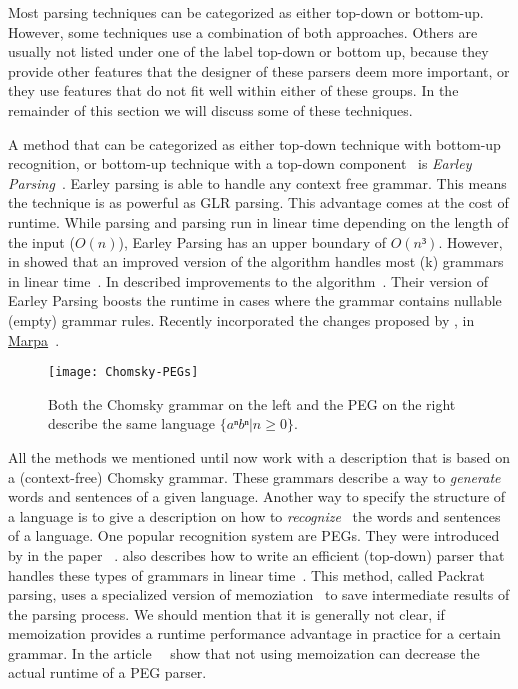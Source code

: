 Most parsing techniques can be categorized as either top-down or bottom-up. However, some techniques use a combination of both approaches. Others are usually not listed under one of the label top-down or bottom up, because they provide other features that the designer of these parsers deem more important, or they use features that do not fit well within either of these groups. In the remainder of this section we will discuss some of these techniques.

A method that can be categorized as either top-down technique with bottom-up recognition, or bottom-up technique with a top-down component~\cite[p. 206]{grune2008parsing} is \emph{Earley Parsing}~\cite{earley1970efficient}. Earley parsing is able to handle any context free grammar. This means the technique is as powerful as GLR parsing. This advantage comes at the cost of runtime. While  parsing and  parsing run in linear time depending on the length of the input ($O(n)$), Earley Parsing has an upper boundary of $O(n³)$. However, in \citeyear{leo1991general} \citeauthor{leo1991general} showed that an improved version of the algorithm handles most (k) grammars in linear time~\cite{kegler2011marpa, leo1991general}. In \citeyear{aycock2002practical} \citeauthor{aycock2002practical} described improvements to the algorithm~\cite{aycock2002practical}. Their version of Earley Parsing boosts the runtime in cases where the grammar contains nullable (empty) grammar rules. Recently \citeauthor{kegler2011marpa} incorporated the changes proposed by \citeauthor{leo1991general}, \citeauthor{aycock2002practical} in \href{http://savage.net.au/Marpa.html}{Marpa}~\cite{kegler2011marpa}.

\begin{figure}
  \centering
    \texttt{[image: Chomsky-PEGs]}
  \caption{Both the Chomsky grammar on the left and the PEG on the right describe the same language $ \{ aⁿ bⁿ | n ≥ 0 \} $.}
\end{figure}

All the methods we mentioned until now work with a description that is based on a (context-free) Chomsky grammar. These grammars describe a way to \emph{generate} words and sentences of a given language. Another way to specify the structure of a language is to give a description on how to \emph{recognize}~\cite[p. 506]{grune2008parsing} the words and sentences of a language. One popular recognition system are \glspl{PEG}. They were introduced by \citeauthor{ford2004parsing} in the paper ~\cite{ford2004parsing}. \citeauthor{ford2002packrat} also describes how to write an efficient (top-down) parser that handles these types of grammars in linear time~\cite{ford2002packrat}. This method, called Packrat parsing, uses a specialized version of memoziation~\cite[p. 1]{ford2002packrat} to save intermediate results of the parsing process. We should mention that it is generally not clear, if memoization provides a runtime performance advantage in practice for a certain grammar. In the article~~\cite{hudak2008dcgs} \citeauthor{hudak2008dcgs} show that not using memoization can decrease the actual runtime of a PEG parser.

